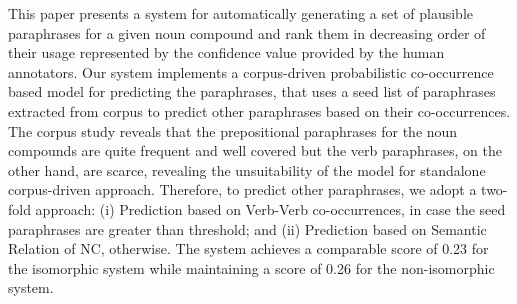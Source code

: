 This paper presents a system for automatically generating a set of plausible paraphrases for a given noun compound and rank them in decreasing order of
 their usage represented by the confidence value provided by the human
 annotators. Our system implements a corpus-driven probabilistic co-occurrence
 based model for predicting the paraphrases, that uses a seed list of
 paraphrases extracted from corpus to predict other paraphrases based on their
 co-occurrences. The corpus study reveals that the prepositional paraphrases for
 the noun compounds are quite frequent and well covered but the verb
 paraphrases, on the other hand, are scarce, revealing the unsuitability of the
 model for standalone corpus-driven approach. Therefore, to predict other
 paraphrases, we adopt a two-fold approach: (i) Prediction based on Verb-Verb
 co-occurrences, in case the seed paraphrases are greater than threshold; and
 (ii) Prediction based on Semantic Relation of NC, otherwise. The system
 achieves a comparable score of 0.23 for the isomorphic system while
 maintaining a score of 0.26 for the non-isomorphic system.

